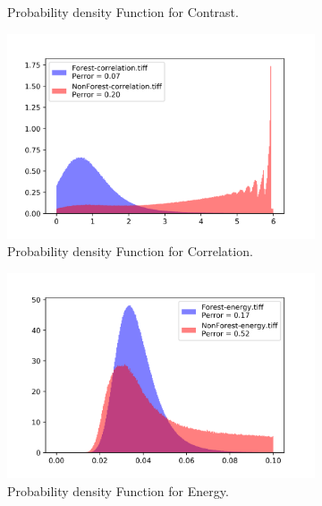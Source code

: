 \begin{figure}[H]
\begin{subfigure}[b]{0.4\linewidth}
     \caption{Probability density Function for Contrast.}
  \end{subfigure}
  \centering
  \begin{subfigure}[b]{0.4\linewidth}
    \includegraphics[width=\linewidth]{Chapter4/sum_and_diff_textures/correlation_hist.png}
     \caption{Probability density Function for Correlation.}
  \end{subfigure}
  \centering
  \begin{subfigure}[b]{0.4\linewidth}
    \includegraphics[width=\linewidth]{Chapter4/sum_and_diff_textures/energy_hist.png}
     \caption{Probability density Function for Energy.}
  \end{subfigure}
  \centering
  \begin{subfigure}[b]{0.4\linewidth}

\end{subfigure}
\end{figure}

